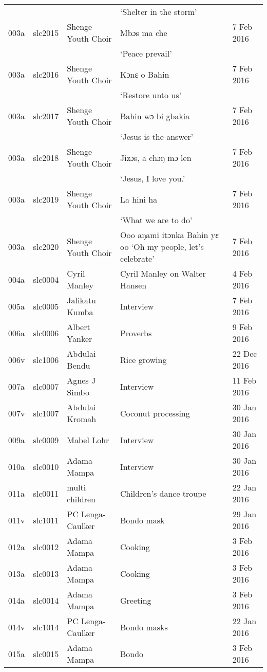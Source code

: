 \begin{xltabular}{\textwidth}{lllQl}
& & & ‘Shelter in the storm' & \\
003a & slc2015 & Shenge Youth Choir & Mbɔs ma che & 7 Feb 2016\\
& & & ‘Peace prevail' & \\
003a & slc2016 & Shenge Youth Choir & Kɔnɛ o Bahin & 7 Feb 2016\\
& & & ‘Restore unto us' & \\
003a & slc2017 & Shenge Youth Choir & Bahin wɔ bi gbakia & 7 Feb 2016\\
& & & ‘Jesus is the answer' & \\
003a & slc2018 & Shenge Youth Choir & Jizɔs, a chɔŋ mɔ len & 7 Feb 2016\\
& & & ‘Jesus, I love you.' & \\
003a & slc2019 & Shenge Youth Choir & La hini ha & 7 Feb 2016\\
& & & ‘What we are to do' & \\
003a & slc2020 & Shenge Youth Choir & Ooo aŋami itɔnka Bahin yɛ oo ‘Oh my people, let's celebrate' & 7 Feb 2016\\
004a & slc0004 & Cyril Manley & Cyril Manley on Walter Hansen & 4 Feb 2016\\
005a & slc0005 & Jalikatu Kumba & Interview & 7 Feb 2016\\
006a & slc0006 & Albert Yanker & Proverbs & 9 Feb 2016\\
006v & slc1006 & Abdulai Bendu & Rice growing & 22 Dec 2016\\
007a & slc0007 & Agnes J Simbo & Interview & 11 Feb 2016\\
007v & slc1007 & Abdulai Kromah & Coconut processing & 30 Jan 2016\\
009a & slc0009 & Mabel Lohr & Interview & 30 Jan 2016\\
010a & slc0010 & Adama Mampa & Interview & 30 Jan 2016\\
011a & slc0011 & multi children & Children's dance troupe & 22 Jan 2016\\
011v & slc1011 & PC Lenga-Caulker & Bondo mask & 29 Jan 2016\\
012a & slc0012 & Adama Mampa & Cooking & 3 Feb 2016\\
013a & slc0013 & Adama Mampa & Cooking & 3 Feb 2016\\
014a & slc0014 & Adama Mampa & Greeting & 3 Feb 2016\\
014v & slc1014 & PC Lenga-Caulker & Bondo masks & 22 Jan 2016\\
015a & slc0015 & Adama Mampa & Bondo & 3 Feb 2016\\

\end{xltabular}
